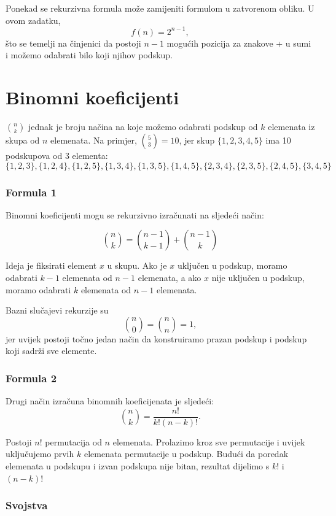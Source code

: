 Ponekad se rekurzivna formula može zamijeniti
formulom u zatvorenom obliku.
U ovom zadatku,
\[
f(n)=2^{n-1},
\]
što se temelji na činjenici da postoji $n-1$
mogućih pozicija za znakove + u sumi
i možemo odabrati bilo koji njihov podskup.

\section{Binomni koeficijenti}


 ${n \choose k}$
jednak je broju načina na koje možemo odabrati podskup
od $k$ elemenata iz skupa od $n$ elemenata.
Na primjer, ${5 \choose 3}=10$,
jer skup $\{1,2,3,4,5\}$
ima 10 podskupova od 3 elementa:
\[ \{1,2,3\}, \{1,2,4\}, \{1,2,5\}, \{1,3,4\}, \{1,3,5\}, 
\{1,4,5\}, \{2,3,4\}, \{2,3,5\}, \{2,4,5\}, \{3,4,5\} \]

\subsubsection{Formula 1}

Binomni koeficijenti mogu se
rekurzivno izračunati na sljedeći način:

\[
{n \choose k}  =  {n-1 \choose k-1} + {n-1 \choose k}
\]

Ideja je fiksirati element $x$ u skupu.
Ako je $x$ uključen u podskup,
moramo odabrati $k-1$
elemenata od $n-1$ elemenata,
a ako $x$ nije uključen u podskup,
moramo odabrati $k$ elemenata od $n-1$ elemenata.

Bazni slučajevi rekurzije su
\[
{n \choose 0}  =  {n \choose n} = 1,
\]
jer uvijek postoji točno
jedan način da konstruiramo prazan podskup
i podskup koji sadrži sve elemente.

\subsubsection{Formula 2}

Drugi način izračuna binomnih koeficijenata je sljedeći:
\[
{n \choose k}  =  \frac{n!}{k!(n-k)!}.
\]

Postoji $n!$ permutacija od $n$ elemenata.
Prolazimo kroz sve permutacije i uvijek
uključujemo prvih $k$ elemenata permutacije
u podskup.
Budući da poredak elemenata u podskupu
i izvan podskupa nije bitan,
rezultat dijelimo s $k!$ i $(n-k)!$

\subsubsection{Svojstva}

